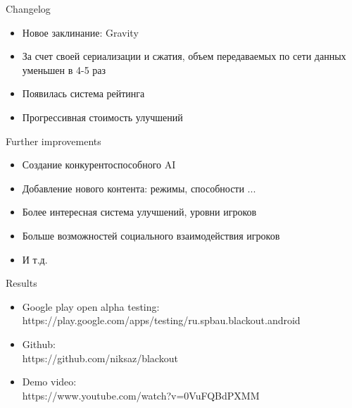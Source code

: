 \documentclass[12pt]{beamer}
\begin{document}
\begin{frame}{Changelog}
    \begin{itemize}
        \item Новое заклинание: Gravity
        \item За счет своей сериализации и сжатия, объем передаваемых по сети данных уменьшен в 4-5 раз
        \item Появилась система рейтинга
        \item Прогрессивная стоимость улучшений
    \end{itemize}
\end{frame}


\begin{frame}{Further improvements}
    \begin{itemize}
        \item <1-> Создание конкурентоспособного AI
        \item <2-> Добавление нового контента: режимы, способности ...
        \item <3-> Более интересная система улучшений, уровни игроков
        \item <4-> Больше возможностей социального взаимодействия игроков
        \item <5-> И т.д.
    \end{itemize}
\end{frame}


\begin{frame}{Results}
    \begin{itemize}
        \item Google play open alpha testing: \\ https://play.google.com/apps/testing/ru.spbau.blackout.android
        \item Github: \\
        https://github.com/niksaz/blackout
        \item Demo video: \\
        https://www.youtube.com/watch?v=0VuFQBdPXMM
    \end{itemize}

\end{frame}
\end{document}
